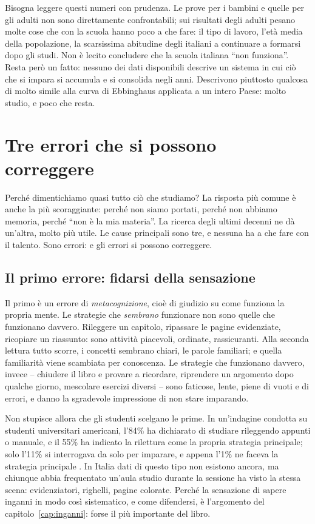 Bisogna leggere questi numeri con prudenza. Le prove per i bambini e
quelle per gli adulti non sono direttamente confrontabili; sui risultati
degli adulti pesano molte cose che con la scuola hanno poco a che fare:
il tipo di lavoro, l'età media della popolazione, la scarsissima
abitudine degli italiani a continuare a formarsi dopo gli studi. Non è
lecito concludere che la scuola italiana \enquote{non funziona}. Resta
però un fatto: nessuno dei dati disponibili descrive un sistema in cui
ciò che si impara si accumula e si consolida negli anni. Descrivono
piuttosto qualcosa di molto simile alla curva di Ebbinghaus applicata a
un intero Paese: molto studio, e poco che resta.

\section{Tre errori che si possono correggere}

Perché dimentichiamo quasi tutto ciò che studiamo? La risposta più
comune è anche la più scoraggiante: perché non siamo portati, perché
non abbiamo memoria, perché \enquote{non è la mia materia}. La ricerca
degli ultimi decenni ne dà un'altra, molto più utile. Le cause
principali sono tre, e nessuna ha a che fare con il talento. Sono
errori: e gli errori si possono correggere.

\subsection*{Il primo errore: fidarsi della sensazione}

Il primo è un errore di \emph{metacognizione}, cioè di giudizio su come
funziona la propria mente. Le strategie che \emph{sembrano} funzionare
non sono quelle che funzionano davvero. Rileggere un capitolo, ripassare
le pagine evidenziate, ricopiare un riassunto: sono attività piacevoli,
ordinate, rassicuranti. Alla seconda lettura tutto scorre, i concetti
sembrano chiari, le parole familiari; e quella familiarità viene
scambiata per conoscenza. Le strategie che funzionano davvero, invece
-- chiudere il libro e provare a ricordare, riprendere un argomento dopo
qualche giorno, mescolare esercizi diversi -- sono faticose, lente,
piene di vuoti e di errori, e danno la sgradevole impressione di non
stare imparando.

Non stupisce allora che gli studenti scelgano le prime. In
un'indagine condotta su studenti universitari americani, l'84\% ha
dichiarato di studiare rileggendo appunti o manuale, e il 55\% ha
indicato la rilettura come la propria strategia principale; solo
l'11\% si interrogava da solo per imparare, e appena l'1\% ne faceva la
strategia principale \parencite{karpicke2009}. In Italia dati di questo
tipo non esistono ancora, ma chiunque abbia frequentato un'aula studio
durante la sessione ha visto la stessa scena: evidenziatori, righelli,
pagine colorate. Perché la sensazione di sapere inganni in modo così
sistematico, e come difendersi, è l'argomento del
capitolo~\ref{cap:inganni}: forse il più importante del libro.


